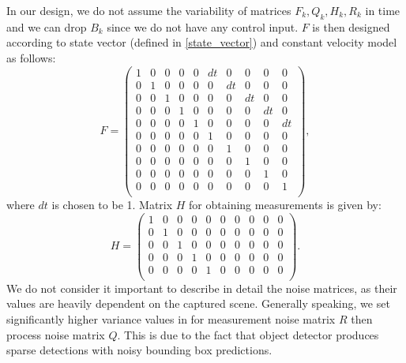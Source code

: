         In our design, we do not assume the variability of matrices $F_k, Q_k, H_k, R_k$ in time and we can drop $B_k$ since we do not have any control input. $F$ is then designed according to state vector (defined in \ref{state_vector}) and constant velocity model as follows:
        \begin{equation}
            F = 
            \begin{pmatrix}
                1 & 0 & 0 & 0 & 0 & dt & 0 & 0 & 0 & 0 \\
                0 & 1 & 0 & 0 & 0 & 0 & dt & 0 & 0 & 0 \\
                0 & 0 & 1 & 0 & 0 & 0 & 0 & dt & 0 & 0 \\
                0 & 0 & 0 & 1 & 0 & 0 & 0 & 0 & dt & 0 \\
                0 & 0 & 0 & 0 & 1 & 0 & 0 & 0 & 0 & dt \\
                0 & 0 & 0 & 0 & 0 & 1 & 0 & 0 & 0 & 0 \\
                0 & 0 & 0 & 0 & 0 & 0 & 1 & 0 & 0 & 0 \\
                0 & 0 & 0 & 0 & 0 & 0 & 0 & 1 & 0 & 0 \\
                0 & 0 & 0 & 0 & 0 & 0 & 0 & 0 & 1 & 0 \\
                0 & 0 & 0 & 0 & 0 & 0 & 0 & 0 & 0 & 1 \\
            \end{pmatrix},
        \end{equation}
        where $dt$ is chosen to be 1. Matrix $H$ for obtaining measurements is given by:
       \begin{equation}
            H = 
            \begin{pmatrix}
                1 & 0 & 0 & 0 & 0 & 0 & 0 & 0 & 0 & 0 \\
                0 & 1 & 0 & 0 & 0 & 0 & 0 & 0 & 0 & 0 \\
                0 & 0 & 1 & 0 & 0 & 0 & 0 & 0 & 0 & 0 \\
                0 & 0 & 0 & 1 & 0 & 0 & 0 & 0 & 0 & 0 \\
                0 & 0 & 0 & 0 & 1 & 0 & 0 & 0 & 0 & 0 \\
            \end{pmatrix}.
        \end{equation}
        We do not consider it important to describe in detail the noise matrices, as  their values are heavily dependent on the captured scene. Generally speaking, we set significantly higher variance values in for measurement noise matrix $R$ then process noise matrix $Q$. This is due to the fact that object detector produces sparse detections with noisy bounding box predictions.

